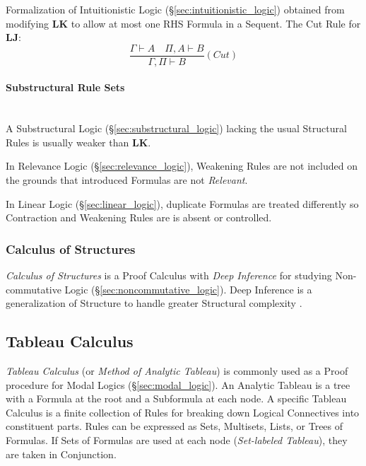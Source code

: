 Formalization of Intuitionistic Logic
(\S\ref{sec:intuitionistic_logic}) obtained from modifying
$\mathbf{LK}$ to allow at most one RHS Formula in a Sequent. The Cut
Rule for $\mathbf{LJ}$:
\[
    \frac{
        \Gamma \vdash A \quad \Pi, A \vdash B
    }{
        \Gamma, \Pi \vdash B
    }(Cut)
\]



\paragraph{Substructural Rule Sets}\label{sec:substructural_rule} \hfill \\

A Substructural Logic (\S\ref{sec:substructural_logic}) lacking the
usual Structural Rules is usually weaker than $\mathbf{LK}$.

In Relevance Logic (\S\ref{sec:relevance_logic}), Weakening Rules
are not included on the grounds that introduced Formulas are not
\emph{Relevant}.

In Linear Logic (\S\ref{sec:linear_logic}), duplicate Formulas are
treated differently so Contraction and Weakening Rules are is absent
or controlled.



\subsubsection{Calculus of Structures}\label{sec:calculus_of_structures}

\emph{Calculus of Structures} is a Proof Calculus with \emph{Deep
  Inference} for studying Non-commutative Logic
(\S\ref{sec:noncommutative_logic}). Deep Inference is a
generalization of Structure to handle greater Structural complexity
\cite{schutte77}.



\subsection{Tableau Calculus}\label{sec:tableau_calculus}

\emph{Tableau Calculus} (or \emph{Method of Analytic Tableau}) is
commonly used as a Proof procedure for Modal Logics
(\S\ref{sec:modal_logic}). An Analytic Tableau is a tree with a
Formula at the root and a Subformula at each node. A specific Tableau
Calculus is a finite collection of Rules for breaking down Logical
Connectives into constituent parts. Rules can be expressed as Sets,
Multisets, Lists, or Trees of Formulas. If Sets of Formulas are used
at each node (\emph{Set-labeled Tableau}), they are taken in
Conjunction.

